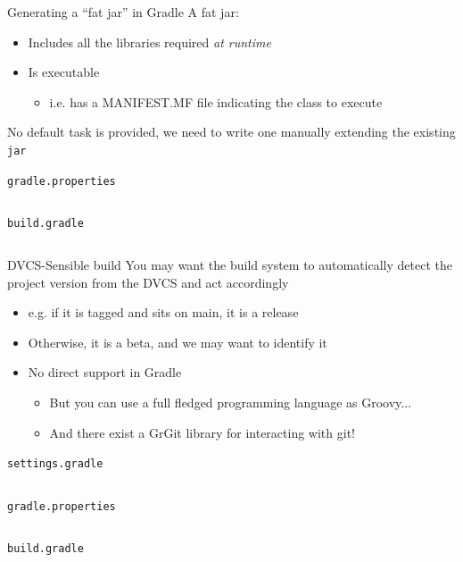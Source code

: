 \documentclass[presentation]{beamer}
\newcommand{\codefile}[4]{
	\begin{block}{\texttt{#2}}
		\inputminted[fontsize=#3,linenos=true,breaklines=true]{#4}{"workspace/#1/#2"}
	\end{block}
}
\newcommand{\kotlin}[3]{\codefile{#1}{#2}{#3}{kotlin}}
\newcommand{\tinier}{\fontsize{4pt}{5pt}\selectfont}
\begin{document}
\begin{frame}{Generating a ``fat jar'' in Gradle}
    A fat jar:
    \begin{itemize}
        \item Includes all the libraries required \textit{at runtime}
        \item Is executable
        \begin{itemize}
            \item i.e. has a MANIFEST.MF file indicating the class to execute
        \end{itemize}
    \end{itemize}
    No default task is provided, we need to write one manually extending the existing \texttt{jar}
    \kotlin{24-Fatjar}{gradle.properties}{\scriptsize}
    \kotlin{24-Fatjar}{build.gradle}{\tinier}
\end{frame}

\begin{frame}{DVCS-Sensible build}
    You may want the build system to automatically detect the project version from the DVCS and act accordingly
    \begin{itemize}
        \item e.g. if it is tagged and sits on main, it is a release
        \item Otherwise, it is a beta, and we may want to identify it
        \item No direct support in Gradle 
        \begin{itemize}
            \item But you can use a full fledged programming language as Groovy...
            \item And there exist a GrGit library for interacting with git!
        \end{itemize}
    \end{itemize}
    \kotlin{26-Git}{settings.gradle}{\scriptsize}
    \kotlin{26-Git}{gradle.properties}{\scriptsize}
    \kotlin{26-Git}{build.gradle}{\tiny}
\end{frame}
\end{document}
